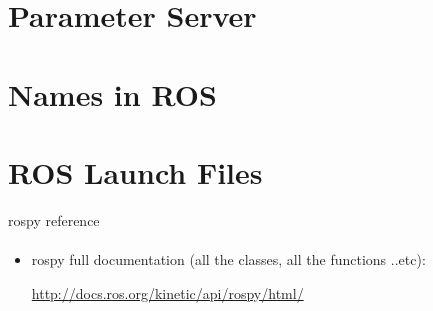 \documentclass{beamer}
\begin{document}
\section{Parameter Server}

\section{Names in ROS}

\section{ROS Launch Files}
    

\begin{frame}[fragile]{rospy reference}
    \framesubtitle{}

\begin{itemize}
    \item rospy full documentation (all the classes, all the functions ..etc):
    
    \vspace{0.5cm}
     \url{http://docs.ros.org/kinetic/api/rospy/html/}
\end{itemize}
    
\end{frame}
\end{document}
